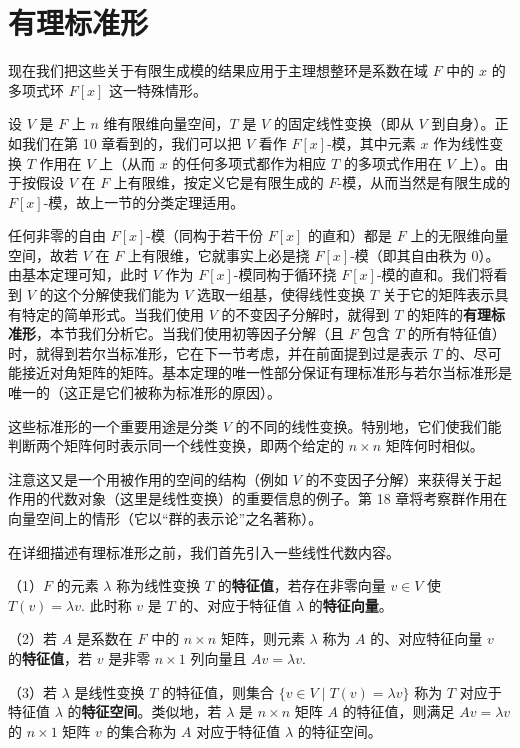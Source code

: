 \section{有理标准形}

现在我们把这些关于有限生成模的结果应用于主理想整环是系数在域 \(F\) 中的 \(x\) 的多项式环 \(F[x]\) 这一特殊情形。

设 \(V\) 是 \(F\) 上 \(n\) 维有限维向量空间，\(T\) 是 \(V\) 的固定线性变换（即从 \(V\) 到自身）。正如我们在第 10 章看到的，我们可以把 \(V\) 看作 \(F[x]\)-模，其中元素 \(x\) 作为线性变换 \(T\) 作用在 \(V\) 上（从而 \(x\) 的任何多项式都作为相应 \(T\) 的多项式作用在 \(V\) 上）。由于按假设 \(V\) 在 \(F\) 上有限维，按定义它是有限生成的 \(F\)-模，从而当然是有限生成的 \(F[x]\)-模，故上一节的分类定理适用。

任何非零的自由 \(F[x]\)-模（同构于若干份 \(F[x]\) 的直和）都是 \(F\) 上的无限维向量空间，故若 \(V\) 在 \(F\) 上有限维，它就事实上必是挠 \(F[x]\)-模（即其自由秩为 0）。由基本定理可知，此时 \(V\) 作为 \(F[x]\)-模同构于循环挠 \(F[x]\)-模的直和。我们将看到 \(V\) 的这个分解使我们能为 \(V\) 选取一组基，使得线性变换 \(T\) 关于它的矩阵表示具有特定的简单形式。当我们使用 \(V\) 的不变因子分解时，就得到 \(T\) 的矩阵的\textbf{有理标准形}，本节我们分析它。当我们使用初等因子分解（且 \(F\) 包含 \(T\) 的所有特征值）时，就得到若尔当标准形，它在下一节考虑，并在前面提到过是表示 \(T\) 的、尽可能接近对角矩阵的矩阵。基本定理的唯一性部分保证有理标准形与若尔当标准形是唯一的（这正是它们被称为标准形的原因）。

这些标准形的一个重要用途是分类 \(V\) 的不同的线性变换。特别地，它们使我们能判断两个矩阵何时表示同一个线性变换，即两个给定的 \(n \times n\) 矩阵何时相似。

注意这又是一个用被作用的空间的结构（例如 \(V\) 的不变因子分解）来获得关于起作用的代数对象（这里是线性变换）的重要信息的例子。第 18 章将考察群作用在向量空间上的情形（它以“群的表示论”之名著称）。

在详细描述有理标准形之前，我们首先引入一些线性代数内容。

\begin{definition}
（1）\(F\) 的元素 \(\lambda\) 称为线性变换 \(T\) 的\textbf{特征值}，若存在非零向量 \(v \in V\) 使 \(T(v) = \lambda v\). 此时称 \(v\) 是 \(T\) 的、对应于特征值 \(\lambda\) 的\textbf{特征向量}。

（2）若 \(A\) 是系数在 \(F\) 中的 \(n \times n\) 矩阵，则元素 \(\lambda\) 称为 \(A\) 的、对应特征向量 \(v\) 的\textbf{特征值}，若 \(v\) 是非零 \(n \times 1\) 列向量且 \(Av = \lambda v\).

（3）若 \(\lambda\) 是线性变换 \(T\) 的特征值，则集合 \(\{v \in V \mid T(v) = \lambda v\}\) 称为 \(T\) 对应于特征值 \(\lambda\) 的\textbf{特征空间}。类似地，若 \(\lambda\) 是 \(n \times n\) 矩阵 \(A\) 的特征值，则满足 \(Av = \lambda v\) 的 \(n \times 1\) 矩阵 \(v\) 的集合称为 \(A\) 对应于特征值 \(\lambda\) 的特征空间。
\end{definition}

